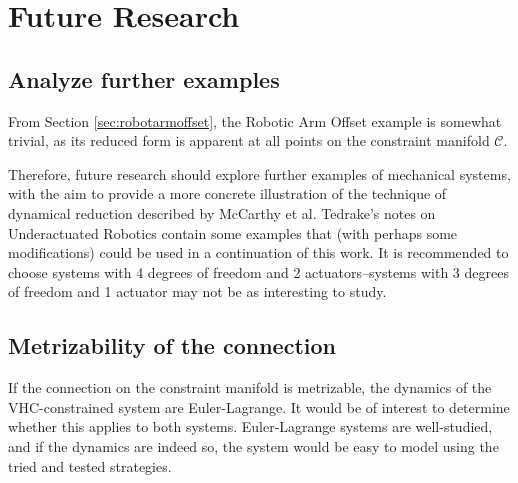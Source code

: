 \documentclass[main.tex]{subfiles}
\begin{document}
\section{Future Research}
\subsection{Analyze further examples}
From Section \ref{sec:robotarmoffset}, the Robotic Arm Offset example is somewhat trivial, as its reduced form is apparent at all points on the constraint manifold $\mathcal{C}$.

Therefore, future research should explore further examples of mechanical systems, with the aim to provide a more concrete illustration of the technique of dynamical reduction described by McCarthy et al\cite{mccarthy}. 
Tedrake's notes on Underactuated Robotics\cite{underactuated} contain some examples that (with perhaps some modifications) could be used in a continuation of this work. It is recommended to choose systems with 4 degrees of freedom and 2 actuators--systems with 3 degrees of freedom and 1 actuator may not be as interesting to study.

\subsection{Metrizability of the connection}
If the connection on the constraint manifold is metrizable, the dynamics of the VHC-constrained system are Euler-Lagrange\cite{mccarthy}. It would be of interest to determine whether this applies to both systems. Euler-Lagrange systems are well-studied, and if the dynamics are indeed so, the system would be easy to model using the tried and tested strategies.
\end{document}
